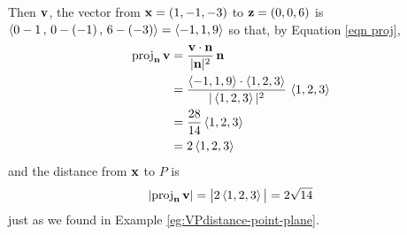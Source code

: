\begin{eg}
Then $\mathbf{v}$, the vector from $\mathbf{x}=(1,-1,-3)$ to $\mathbf{z}=(0,0,6)$ is
$\left< 0-1\,,\,0-(-1)\,,\,6-(-3)  \right>=\left< -1,1,9\right>$ so that, 
by Equation \eqref{eqn proj},
\begin{align*}
{\rm proj}_{\mathbf{n}}\,\mathbf{v}&=\frac{\mathbf{v}\cdot\mathbf{n}}{|\mathbf{n}|^2}\,\mathbf{n} \\
    &= \frac{\left< -1,1,9\right>\cdot\left< 1,2,3\right>}{|\left< 1,2,3\right>|^2}\,
               \left< 1,2,3\right> \\
    &= \frac{28}{14} \left< 1,2,3\right> \\
    &= 2 \left< 1,2,3\right> 
\end{align*} 
and the distance from $\mathbf{x}$ to $P$ is
\begin{align*}
\left|{\rm proj}_{\mathbf{n}}\,\mathbf{v}\right| = \big|2 \left< 1,2,3\right>\big|
   =2\sqrt{14}
\end{align*}
just as we found in Example \ref{eg:VPdistance-point-plane}.
\end{eg}


